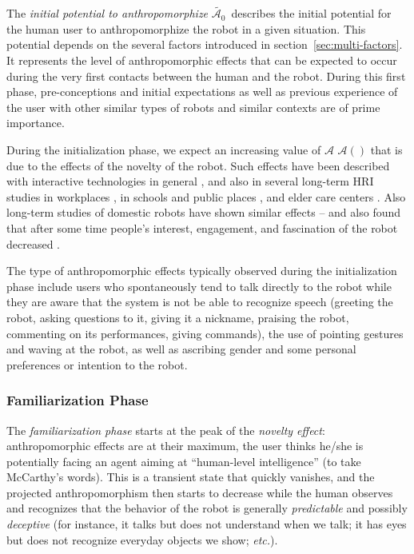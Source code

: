 \documentclass{frontiersSCNS} %
\newcommand{\etc}{\textit{etc.}\xspace}
\newcommand{\Ant}[1][]{%
      \ifthenelse{\isempty{#1}}%
        {$\mathcal{A}$}
        {$\mathcal{A}(#1)$}
}
\newcommand{\IPAe}{{$\widetilde{\mathcal{A}_0}$~}}
\begin{document}
The \emph{initial potential to anthropomorphize} \IPAe describes the initial
potential for the human user to anthropomorphize the robot in a given situation.
This potential depends on the several factors introduced in
section~\ref{sec:multi-factors}.  It represents the level of anthropomorphic
effects that can be expected to occur during the very first contacts between the
human and the robot. During this first phase, pre-conceptions and initial
expectations as well as previous experience of the user with other similar types
of robots and similar contexts are of prime importance.

During the initialization phase, we expect an increasing value of \Ant that is
due to the effects of the novelty of the robot. Such effects have been described
with interactive technologies in general \citep{rogers_diffusion_1995}, and also
in several long-term HRI studies in workplaces
\citep{huttenrauch_fetch-and-carry_2003,mutlu_robots_2008}, in schools and
public places
\citep{gockley_designing_2005,kanda_communication_2005,kanda_interactive_2004},
and elder care centers \citep{sabelli_conversational_2011}. Also long-term
studies of domestic robots have shown similar effects -- and also found that
after some time people's interest, engagement, and fascination of the robot
decreased
\citep{sung_robots_2009,sung_domestic_2010,fernaeus_how_2010,fink_living_2013}.

The type of anthropomorphic effects typically observed during the initialization
phase include users who spontaneously tend to talk directly to the robot while
they are aware that the system is not be able to recognize speech (greeting the
robot, asking questions to it, giving it a nickname, praising the robot,
commenting on its performances, giving commands), the use of pointing gestures
and waving at the robot, as well as ascribing gender and some personal
preferences or intention to the robot.

\subsubsection{Familiarization Phase\\}

The \emph{familiarization phase} starts at the peak of the \emph{novelty
effect}: anthropomorphic effects are at their maximum, the user thinks he/she is
potentially facing an agent aiming at ``human-level intelligence'' (to take
McCarthy's words). This is a transient state that quickly vanishes, and the
projected anthropomorphism then starts to decrease while the human observes and
recognizes that the behavior of the robot is generally \emph{predictable} and
possibly \emph{deceptive} (for instance, it talks but does not understand when
we talk; it has eyes but does not recognize everyday objects we show; \etc).
\end{document}
